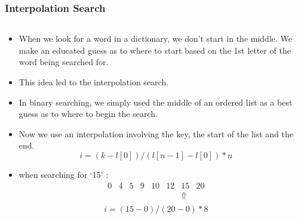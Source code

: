 
\begin{frame}[fragile]
\frametitle{Interpolation Search}
\begin{columns}[T]

\begin{column}{0.50\textwidth}
\begin{itemize}
\item When we look for a word in a dictionary, we don't start in the middle.
We make an educated guess as to where to start based on the 1st letter of the
word being searched for.
\item This idea led to the interpolation search.
\item In binary searching, we simply used the middle of an ordered list as a best guess as to where to begin the search.
\item Now we use an interpolation involving the key, the start of the list and the end.
\[
i = (k - l[0])/(l[n-1] - l[0])*n
\]
\item when searching for `15' :
\[
\begin{array}{cccccccc}
0 & 4 & 5 & 9 & 10 & 12 & 15 & 20\\
&&&&&&\Uparrow&\\
\end{array}
\]
\[
i = (15-0)/(20-0)*8
\]
\end{itemize}
\end{column}

\pause
\begin{column}{0.40\textwidth}

\end{column}

\end{columns}
\end{frame}


